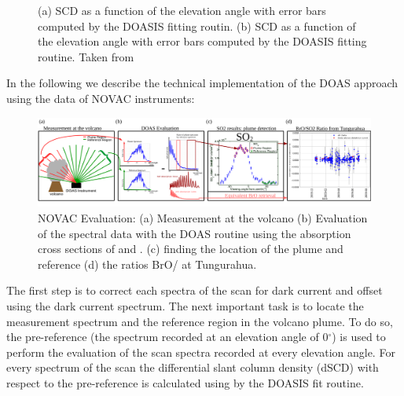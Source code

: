 \begin{figure}
	\caption{(a)  SCD as a function of the elevation angle with error bars computed by the DOASIS fitting routin. (b)  SCD as a function of the elevation angle with error bars computed by the DOASIS fitting routine.  Taken from \cite{WarnachSimon}}
	\label{fig:plumeref}
\end{figure}
%
In the following we describe the technical implementation of the DOAS approach using the data of NOVAC instruments:\\
\begin{figure}
	\centering
	\includegraphics[width=1\linewidth]{Bilder/NOVAC_Eval}
	\caption{NOVAC Evaluation: (a) Measurement at the volcano (b) Evaluation of the spectral data with the DOAS routine using the absorption cross sections of   and . (c) finding the location of the plume and reference (d) the ratios BrO/ at Tungurahua. }
	\label{fig:NOVAC_Eval}
\end{figure}
%
The first step is to correct each spectra of the scan for dark current and offset using the dark current spectrum.
The next important task is to locate the measurement spectrum and the reference region in the volcano plume. 
To do so, the pre-reference (the spectrum recorded at an elevation angle of  0$^{\circ} $) is used to perform the evaluation of the scan spectra recorded at every elevation angle.
For every spectrum of the scan the  differential slant column density (dSCD) with respect to the pre-reference is calculated using  by the DOASIS fit routine.

